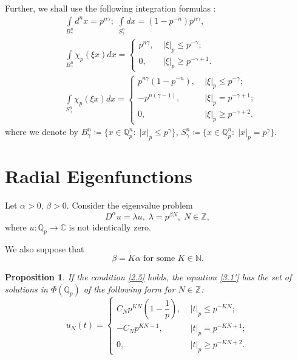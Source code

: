 \documentclass[14pt]{article}
\theoremstyle{theorem}
\theoremstyle{theorem}
\newtheorem{proposition}{Proposition}[section]
\theoremstyle{definition}
\theoremstyle{lemma}
\newcommand{\Label}[1]{\label{#1}}
\numberwithin{equation}{section}
\begin{document}
Further, we shall use the following integration formulas \cite{VVZ}:
\begin{align}
\Label{0-44}
&\int\limits_{B_{\gamma}^n}d^nx=p^{n\gamma};\;\int\limits_{S_{\gamma}^n}dx=\left(1-p^{-n}\right)p^{n\gamma},\\
\Label{3.1}
&\int\limits_{B_{\gamma}^n}\chi_p(\xi x)dx=
\left\{
\begin{array}{ll}
p^{n\gamma},\;&|\xi|_p\leq p^{-\gamma};\\
0,\;&|\xi|_p\geq p^{-\gamma+1}.
\end{array}
\right.\\
\Label{3.2}
&\int\limits_{S_{\gamma}^n}\chi_p(\xi x)dx=
\left\{
\begin{array}{ll}
p^{n\gamma}(1-p^{-n}),\;&|\xi|_p\leq p^{-\gamma};\\
-p^{n(\gamma-1)},\;&|\xi|_p=p^{-\gamma+1};\\
0,\;&|\xi|_p\geq p^{-\gamma+2}.
\end{array}
\right.
\end{align}
where we denote by $B_\gamma^n\coloneqq\{x\in\mathbb{Q}_p^n:\;|x|_p\leq p^{\gamma}\}$, $S_{\gamma}^n\coloneqq\{x\in\mathbb{Q}_p^n:\;|x|_p=p^{\gamma}\}$.

\section{Radial Eigenfunctions}

Let $\alpha>0$, $\beta>0$. Consider the eigenvalue problem
\begin{equation}\Label{3.1'}
D^{\alpha}u=\lambda{u},\;\lambda=p^{\beta N},\;N\in\mathbb{Z},
\end{equation}
where $u:\mathbb{Q}_p\to\mathbb{C}$ is not identically zero.

We also suppose that
\begin{equation}\Label{2.5}
\beta=K\alpha\mbox{ for some }K\in\mathbb{N}.
\end{equation}

\begin{proposition}\Label{Pr1}
If the condition \eqref{2.5} holds, the equation \eqref{3.1'} has the set of solutions in $\Phi(\mathbb{Q}_p)$ of the following form for $N\in\mathbb{Z}$:
\begin{equation}\Label{3.12}
u_N(t)=\left\{
\begin{array}{ll}
C_Np^{KN}(1-\dfrac{1}{p}),\;&|t|_p\leq p^{-KN};\\
-C_Np^{KN-1},\;&|t|_p=p^{-KN+1};\\
0,\;&|t|_p\geq p^{-KN+2}.
\end{array}
\right.
\end{equation}
\end{proposition}
\end{document}
